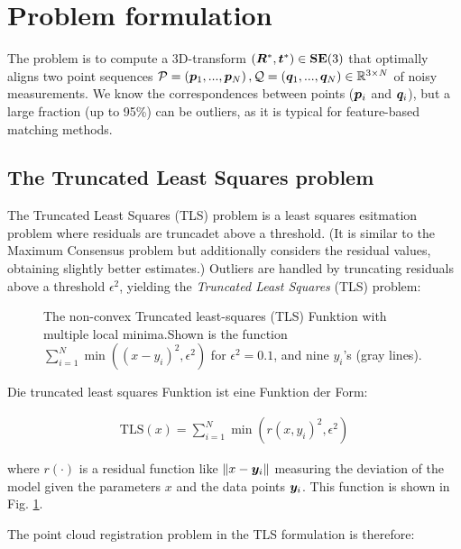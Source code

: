 
\section{Problem formulation}
The problem is to compute a 3D-transform $({\bm R}^*, \boldsymbol{t}^*) \in \mathbf{SE(\textrm{3})}$ that optimally aligns two point sequences $\mathcal{P} = \left(\boldsymbol{p}_1, ..., \boldsymbol{p}_N\right), \mathcal{Q} = \left(\boldsymbol{q}_1, ..., \boldsymbol{q}_N\right) \in \mathbb{R}^{3 \times N}$ of noisy measurements. We know the correspondences between points ($\boldsymbol{p}_i$ and $\boldsymbol{q}_i$), but a large fraction (up to 95\%) can be outliers, as it is typical for feature-based matching methods.
\subsection{The Truncated Least Squares problem}
The Truncated Least Squares (TLS) problem is a least squares esitmation problem where residuals are truncadet above a threshold. (It is similar to the Maximum Consensus problem but additionally considers the residual values, obtaining slightly better estimates.)
Outliers are handled by truncating residuals above a threshold $\epsilon^2$, yielding the \textit{Truncated Least Squares} (TLS) problem:

\begin{figure}[!ht]
	\centering
	\begin{adjustbox}{width=1.\linewidth}
		
	\end{adjustbox}
	\caption{The non-convex Truncated least-squares (TLS) Funktion with multiple local minima.Shown is the function  $\sum_{i=1}^{N}\min((x - y_i)^2, \epsilon^2)$ for $\epsilon^2=0.1$, and nine $y_i$'s (gray lines).}
	\label{fig:tlscostmulterm}
\end{figure}

Die truncated least squares Funktion ist eine Funktion der Form: 

\begin{equation}
	\begin{aligned}
		\text{TLS}(x) = \sum_{i=1}^{N}\min(r(x, y_i)^2, \epsilon^2)
	\end{aligned}
\end{equation}

where $r(\cdot)$ is a residual function like $\left\| x - \boldsymbol{y}_i \right\|$ measuring the deviation of the model given the parameters $x$ and the data points $\boldsymbol{y}_i$. This function is shown in Fig. \ref{fig:tlscostmulterm}.

The point cloud registration problem in the TLS formulation is therefore:

